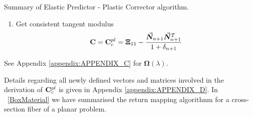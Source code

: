 {\begin{Thesisbox}[label={BoxMaterial}]{Summary of Elastic Predictor - 
		Plastic Corrector algorithm.}
\begin{enumerate}
			\vspace{-1.7cm}
			\hspace{-0.15cm}\begin{minipage}[t]{0.3\linewidth}
				\begin{alignat*}{2}
					\blacksquare\hspace{0.3cm}	&\bvec{\zeta}_{n+1} &&=
					\bm{\Omega}(\lambda)\bvec{\zeta}_{n+1}^{TR}\\
					\blacksquare\hspace{0.3cm}	&\bvec{\epsilon}^{pl}_{n+1} &&= 
					\bvec{\epsilon}^{pl}_n + \lambda\bvec{n}_{n+1}\\
					\blacksquare\hspace{0.3cm}	&\bvec{\alpha}_{n+1} &&= 
					\bvec{\alpha}_n + \lambda 
					H_{kin}\bmat{V}^{-1}\bvec{n}_{n+1}\\
				\end{alignat*}
			\end{minipage}
			\begin{minipage}[t]{0.4\linewidth}
				\begin{alignat*}{2}
					\blacksquare\hspace{0.3cm} &\bvec{\sigma}_{n+1} &&= 
					\bvec{\zeta}_{n+1} + \bvec{\alpha}_{n+1}\\
					\blacksquare\hspace{0.3cm} &e^{pl}_{n+1} &&= e^{pl}_n + 
					\lambda \\
					\blacksquare\hspace{0.3cm}	&q_{n+1} &&= q_n + 
					\lambda\frac{\partial
						q_{n+1}}{\partial e_{n+1}^{pl}}
				\end{alignat*}
			\end{minipage}
			
			\vspace{-0.5cm}
			\item Get consistent tangent modulus
			\vspace{-0.5cm}
			$$\mathbf{C}=\mathbf{C}_c^{pl} = 
			\mathbf{\Xi}_{11}-\frac{\vec{\bm{N}}_{n+1}\vec{\bm{N}}_{n+1}^T}{1+\delta_{n+1}}$$
		\end{enumerate}
		See Appendix \ref{appendix:APPENDIX_C} for $\bm{\Omega}(\lambda)$.
	\end{Thesisbox}
}
\clearpage

Details regarding all newly defined vectors and matrices involved in the
derivation of $\mathbf{C}_c^{pl}$ is given in Appendix \ref{appendix:APPENDIX_D}. 
In ~\cref{BoxMaterial} 
we have summarised the return mapping algorithnm for a cross-section fiber of a 
planar problem.

